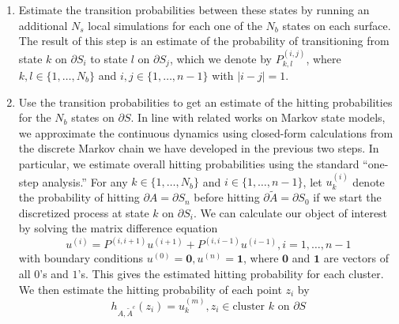 \documentclass[english, aip, jcp, priprint, graphicx]{revtex4-1}
\theoremstyle{plain}
\theoremstyle{definition}
\theoremstyle{plain}
\begin{document}
{{\begin{enumerate}
\begin{enumerate}
  \item Sequentially evolve the ensembles on $\partial S_{m - 1}, \ldots,
  \partial S_2$ and on $\partial S_{m + 1}, \ldots, \partial S_{n - 2}$, until
  we have $N_p$ samples on all of the intermediate surfaces $\partial S_1,
  \ldots, \partial S_{n - 1}$. Store the redundant trials for future
  estimation of transition probabilities.
  
  \item For each one of the surfaces $\partial S_1, \ldots, \partial S_{n -
  1}$, cluster the $N_p$ samples on that surface into $N_b \,$ states. 
\end{enumerate}

The result of this step is a partitioning of each shell $\partial S_i$ into
$N_b$ discrete regions. 

\item Estimate the transition probabilities between these states by running an additional $N_s$ local simulations for each one of the $N_b$ states on each surface. The result of this step is an estimate of the probability of transitioning from state $k$ on $\partial S_i$ to state $l$ on $\partial S_j$, which we denote by $P^{(i, j)}_{k, l}$, where $k, l \in \{ 1, \ldots, N_b \}$ and $i, j \in \{ 1, \ldots, n - 1 \}$ with $| i - j | = 1$.
  
\item Use the transition probabilities to get an estimate of the hitting probabilities for the $N_b$ states on
  $\partial S$.  In line with related works on Markov state models,\cite{Pande2010-yi, Chodera2014-bh, Husic2018-xp} we  approximate the continuous dynamics using closed-form calculations from the discrete Markov chain we have developed in the previous two steps.  In particular, we estimate overall hitting probabilities using the standard ``one-step analysis.'' For any $k \in \{ 1, \ldots, N_b \}$ and $i \in \{ 1, \ldots, n - 1 \}$, let $u^{(i)}_k$ denote the probability of hitting $\partial A = \partial S_n$ before hitting $\partial \tilde{A} = \partial S_0$ if we start the discretized process at state $k$ on $\partial S_i$.  We can calculate our object of interest by solving the matrix difference equation \[ u^{(i)} = P^{(i, i + 1)} u^{(i + 1)} + P^{(i, i - 1)} u^{(i - 1)}, i = 1, \ldots, n - 1 \] with boundary conditions $u^{(0)} = {\textbf{0}}, u^{(n)} = {\textbf{1} }$, where ${\textbf{0}}$ and ${\textbf{1}}$ are vectors of all $0$'s and $1$'s. This gives the estimated hitting probability for each cluster.  We then estimate the hitting probability of each point $z_i$ by
  \begin{equation}
	  \label{equ:hitprobest}
  h_{A,\tilde A^c}(z_i) = u^{(m)}_k, z_i \in \text{cluster }k\text{ on }\partial S\end{equation}
\end{enumerate}
}}
\end{document}
